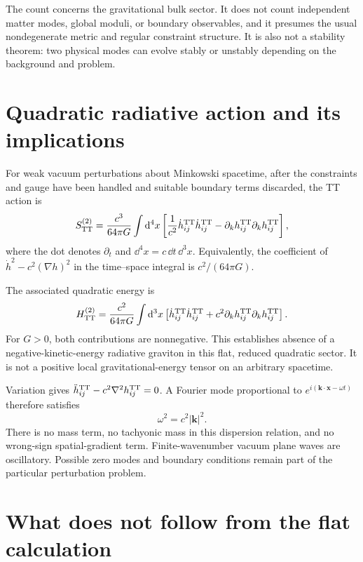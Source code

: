 \documentclass[11pt]{article}
\begin{document}
The count concerns the gravitational bulk sector. It does not count independent matter modes, global moduli, or boundary observables, and it presumes the usual nondegenerate metric and regular constraint structure. It is also not a stability theorem: two physical modes can evolve stably or unstably depending on the background and problem.

\section{Quadratic radiative action and its implications}
For weak vacuum perturbations about Minkowski spacetime, after the constraints and gauge have been handled and suitable boundary terms discarded, the TT action is
\begin{equation}
S_{\mathrm{TT}}^{(2)}=\frac{c^3}{64\pi G}\int\mathrm d^4x\left[
\frac{1}{c^2}\dot h^{\mathrm{TT}}_{ij}\dot h^{\mathrm{TT}}_{ij}
-\partial_kh^{\mathrm{TT}}_{ij}\partial_kh^{\mathrm{TT}}_{ij}\right],
\label{eq:ttaction}
\end{equation}
where the dot denotes $\partial_t$ and $\dd^4x=c\,\dd t\,\dd^3x$. Equivalently, the coefficient of $\dot h^2-c^2(\nabla h)^2$ in the time--space integral is $c^2/(64\pi G)$.

The associated quadratic energy is
\begin{equation}
H_{\mathrm{TT}}^{(2)}=\frac{c^2}{64\pi G}\int\mathrm d^3x\left[
\dot h^{\mathrm{TT}}_{ij}\dot h^{\mathrm{TT}}_{ij}
+c^2\partial_kh^{\mathrm{TT}}_{ij}\partial_kh^{\mathrm{TT}}_{ij}\right].
\end{equation}
For $G>0$, both contributions are nonnegative. This establishes absence of a negative-kinetic-energy radiative graviton in this flat, reduced quadratic sector. It is not a positive local gravitational-energy tensor on an arbitrary spacetime.

Variation gives $\ddot h^{\mathrm{TT}}_{ij}-c^2\nabla^2h^{\mathrm{TT}}_{ij}=0$. A Fourier mode proportional to $e^{i(\mathbf k\cdot\mathbf x-\omega t)}$ therefore satisfies
\begin{equation}
\omega^2=c^2|\mathbf k|^2.
\end{equation}
There is no mass term, no tachyonic mass in this dispersion relation, and no wrong-sign spatial-gradient term. Finite-wavenumber vacuum plane waves are oscillatory. Possible zero modes and boundary conditions remain part of the particular perturbation problem.

\section{What does not follow from the flat calculation}
\end{document}
